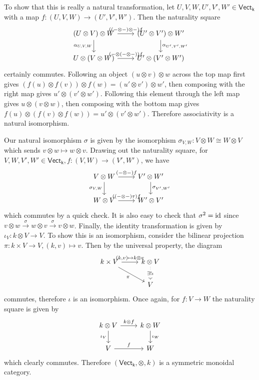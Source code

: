\begin{example}
To show that this is really a natural transformation, let $U,V,W, U',V',W' \in \mathsf{Vect_k}$ with a map $f \colon (U,V,W) \to (U',V',W')$. Then the naturality square \[
    \begin{tikzcd}
(U\otimes V)\otimes W \arrow[r, "((-\otimes-)\otimes -)f"] \arrow[d, "{\alpha_{U,V,W}}"'] & (U'\otimes V')\otimes W' \arrow[d, "{\alpha_{U',V',W'}}"] \\
U\otimes (V\otimes W) \arrow[r, "(-\otimes (- \otimes -))f"]                              & U'\otimes (V'\otimes W')                                 
\end{tikzcd}
\] certainly commutes. Following an object $(u\otimes v)\otimes w$ across the top map first gives $(f(u)\otimes f(v))\otimes f(w)=(u'\otimes v')\otimes w'$, then composing with the right map gives  $u'\otimes (v'\otimes w')$. Following this element through the left map gives $u\otimes (v\otimes w)$, then composing with the bottom map gives  $f(u)\otimes (f(v)\otimes f(w))=u'\otimes (v'\otimes w')$. Therefore associativity is a natural isomorphism. 

Our natural isomorphism $\sigma$ is given by the isomorphism $\sigma_{V,W} \colon V\otimes W \cong W\otimes V$ which sends $v\otimes w \mapsto w\otimes v$. Drawing out the naturality square, for $V,W, V',W' \in \mathsf{Vect_k}, f\colon (V,W) \to (V',W')$, we have \[
\begin{tikzcd}
    V\otimes W \arrow[r,"(-\otimes -)f"]\arrow[d,"\sigma_{V,W}"'] & V' \otimes W' \arrow[d,"\sigma_{V',W'}"]\\
    W\otimes V \arrow[r,"((-\otimes -) \tau)f"] &W' \otimes V'
\end{tikzcd}
\] which commutes by a quick check. It is also easy to check that $\sigma^2=\operatorname{id}$ since $ v\otimes w \xrightarrow{\sigma} w\otimes v \xrightarrow{\sigma} v\otimes w$. Finally, the identity transformation is given by $\iota_V \colon k\otimes V \to V$. To show this is an isomorphism, consider the bilinear projection $\pi \colon k \times V \to V, (k,v) \mapsto  v$. Then by the universal property, the diagram \[
\begin{tikzcd}
k \times V \arrow[r, "{(k,v) \mapsto k \otimes v}"] \arrow[rd, "\pi"'] & k\otimes V \arrow[d, "\exists!\iota" description, dotted] \\
                                                                       & V                                                   
\end{tikzcd}
\] commutes, therefore $\iota$ is an isomorphism. Once again, for $f \colon V \to W$ the naturality square is given by \[
\begin{tikzcd}
    k\otimes V \arrow[r,"k\otimes f"]\arrow[d,"\iota_V"'] & k\otimes W\arrow[d,"\iota_W"]\\
    V \arrow[r,"f"] & W
\end{tikzcd}
\] which clearly commutes. Therefore $(\mathsf{Vect_k},\otimes, k)$ is a symmetric monoidal category.
\end{example}
